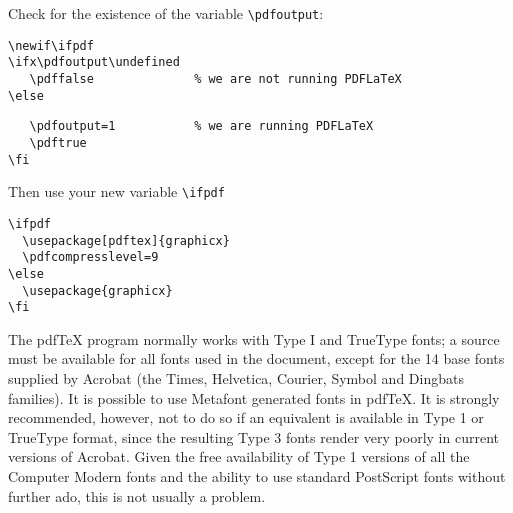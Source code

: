 \documentclass{article}
\begin{document}

Check for the existence of the variable \verb+\pdfoutput+:

\begin{verbatim}
\newif\ifpdf
\ifx\pdfoutput\undefined
   \pdffalse              % we are not running PDFLaTeX
\else
\end{verbatim}

\begin{verbatim}
   \pdfoutput=1           % we are running PDFLaTeX
   \pdftrue
\fi
\end{verbatim}

Then use your new variable \verb+\ifpdf+

\begin{verbatim}
\ifpdf
  \usepackage[pdftex]{graphicx}
  \pdfcompresslevel=9
\else
  \usepackage{graphicx}
\fi
\end{verbatim}





The pdf\TeX{} program normally works with Type I and TrueType fonts; a
source must be available for all fonts used in the document, except for
the 14 base fonts supplied by Acrobat (the Times, Helvetica, Courier,
Symbol and Dingbats families). It is possible to use Metafont generated
fonts in pdf\TeX. It is strongly recommended, however, not to do so if
an equivalent is available in Type 1 or TrueType format, since the
resulting Type 3 fonts render very poorly in current versions of
Acrobat. Given the free availability of Type 1 versions of all the
Computer Modern fonts and the ability to use standard PostScript fonts
without further ado, this is not usually a problem.




{}



{}
\end{document}
